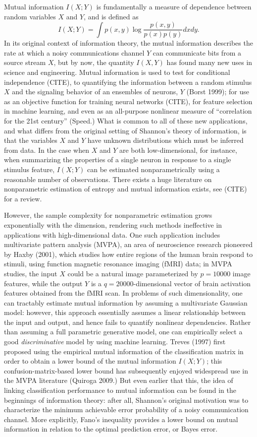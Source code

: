 \documentclass{article}
\begin{document}
Mutual information $I(X; Y)$ is fundamentally a measure of dependence
between random variables $X$ and $Y$, and is defined as
\[
I(X;Y) = \int p(x, y) \log \frac{p(x, y)}{p(x)p(y)}dxdy.
\]
In its original context of information theory, the mutual information
describes the rate at which a noisy communications channel $Y$ can
communicate bits from a source stream $X$, but by now, the quantity
$I(X, Y)$ has found many new uses in science and engineering.  Mutual
information is used to test for conditional independence (CITE), to
quantifying the information between a random stimulus $X$ and the
signaling behavior of an ensembles of neurons, $Y$ (Borst 1999); for
use as an objective function for training neural networks (CITE), for
feature selection in machine learning, and even as an all-purpose
nonlinear measure of ``correlation for the 21st century'' (Speed.)
What is common to all of these new applications, and what differs from
the original setting of Shannon's theory of information, is that the
variables $X$ and $Y$ have unknown distributions which must be
inferred from data.  In the case when $X$ and $Y$ are both
low-dimensional, for instance, when summarizing the properties of a
single neuron in response to a single stimulus feature, $I(X; Y)$ can
be estimated nonparametrically using a reasonable number of
observations.  There exists a huge literature on nonparametric
estimation of entropy and mutual information exists, see (CITE) for a
review.

However, the sample complexity for nonparametric estimation grows
exponentially with the dimension, rendering such methods ineffective
in applications with high-dimensional data.  One such application
includes multivariate pattern analysis (MVPA), an area of neuroscience
research pioneered by Haxby (2001), which studies how entire regions
of the human brain respond to stimuli, using function magnetic
resonance imaging (fMRI) data; in MVPA studies, the input $X$ could be
a natural image parameterized by $p = 10000$ image features, while the
output $Y$ is a $q=20000$-dimensional vector of brain activation
features obtained from the fMRI scan.  In problems of such
dimensionality, one can tractably estimate mutual information by
assuming a multivariate Gaussian model: however, this approach
essentially assumes a linear relationship between the input and
output, and hence fails to quantify nonlinear dependencies.  Rather
than assuming a full parametric generative model, one can empirically
select a good \emph{discriminative} model by using machine learning.
Treves (1997) first proposed using the empirical mutual information of
the classification matrix in order to obtain a lower bound of the
mutual information $I(X; Y)$; this confusion-matrix-based lower bound
has subsequently enjoyed widespread use in the MVPA literature
(Quiroga 2009.)  But even earlier that this, the idea of linking
classification performance to mutual information can be found in the
beginnings of information theory: after all, Shannon's original
motivation was to characterize the minimum achievable error
probability of a noisy communication channel.  More explicitly, Fano's
inequality provides a lower bound on mutual information in relation to
the optimal prediction error, or Bayes error. 
\end{document}
